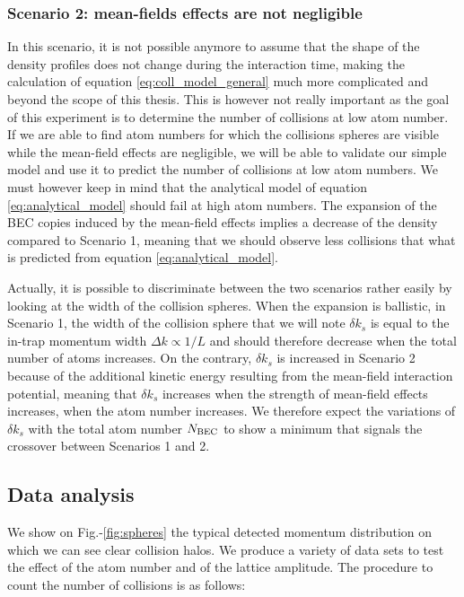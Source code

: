 \subsubsection{Scenario 2: mean-fields effects are not negligible}

In this scenario, it is not possible anymore to assume that the shape of the density profiles does not change during the interaction time, making the calculation of equation \ref{eq:coll_model_general} much more complicated and beyond the scope of this thesis. This is however not really important as the goal of this experiment is to determine the number of collisions at low atom number. If we are able to find atom numbers for which the collisions spheres are visible while the mean-field effects are negligible, we will be able to validate our simple model and use it to predict the number of collisions at low atom numbers. We must however keep in mind that the analytical model of equation \ref{eq:analytical_model} should fail at high atom numbers. The expansion of the BEC copies induced by the mean-field effects implies a decrease of the density compared to Scenario 1, meaning that we should observe less collisions that what is predicted from equation \ref{eq:analytical_model}.

Actually, it is possible to discriminate between the two scenarios rather easily by looking at the width of the collision spheres. When the expansion is ballistic, \ie in Scenario 1, the width of the collision sphere that we will note $\delta k_s$ is equal to the in-trap momentum width $\Delta k \propto 1/L$ and should therefore decrease when the total number of atoms increases. On the contrary, $\delta k_s$ is increased in Scenario 2 because of the additional kinetic energy resulting from the mean-field interaction potential, meaning that $\delta k_s$ increases when the strength of mean-field effects increases, \ie when the atom number increases. We therefore expect the variations of $\delta k_s$ with the total atom number $N_{\rm{BEC}}$ to show a minimum that signals the crossover between Scenarios 1 and 2.

\subsection{Data analysis}

We show on Fig.-\ref{fig:spheres} the typical detected momentum distribution on which we can see clear collision halos. We produce a variety of data sets to test the effect of the atom number and of the lattice amplitude. The procedure to count the number of collisions is as follows:

